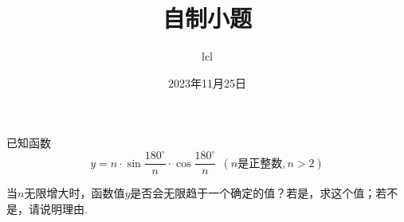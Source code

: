 \documentclass[11pt]{article}
\title{自制小题}
\date{2023年11月25日}
\author{lcl}
\begin{document}
\maketitle
已知函数$$y=n \cdot \sin \frac{180^{\circ}}{n} \cdot \cos \frac{180^{\circ}}{n} \ \ (n\text{是正整数},n > 2)$$ \par
当$n$无限增大时，函数值$y$是否会无限趋于一个确定的值？若是，求这个值；若不是，请说明理由.
\end{document}
